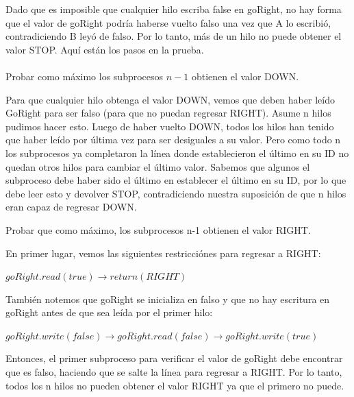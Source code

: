 \documentclass[12pt, letterpaper]{article}
\begin{document}
\begin{itemize}
Dado que es imposible que cualquier hilo escriba false en goRight, no hay forma que el valor de goRight podr\'ia haberse vuelto falso una vez que A lo escribi\'o, contradiciendo B ley\'o de falso.
Por lo tanto, m\'as de un hilo no puede obtener el valor STOP. Aqu\'i están los pasos en la prueba.
\\ \\
Probar como m\'aximo los subprocesos $n-1$ obtienen el valor DOWN.

Para que cualquier hilo obtenga el valor DOWN, vemos que deben haber leído
GoRight para ser falso (para que no puedan regresar RIGHT). Asume n hilos
pudimos hacer esto. Luego de haber vuelto DOWN, todos los hilos
han tenido que haber leído por última vez para ser desiguales a su valor. Pero como todo n
los subprocesos ya completaron la línea donde establecieron el último en su ID
no quedan otros hilos para cambiar el último valor. Sabemos que algunos
el subproceso debe haber sido el último en establecer el último en su ID, por lo que debe leer
esto y devolver STOP, contradiciendo nuestra suposición de que n hilos eran
capaz de regresar DOWN.



Probar que como máximo, los subprocesos n-1 obtienen el valor RIGHT.

En primer lugar, vemos las siguientes restricci\'ones para regresar a RIGHT:


\begin{center}
$goRight.read(true) \rightarrow return(RIGHT)$
\end{center}

También notemos que goRight se inicializa en falso y que no hay escritura en goRight antes de que sea le\'ida por el primer hilo:

\begin{center}
$goRight.write(f alse) \rightarrow goRight.read(f alse) \rightarrow goRight.write(true)$
\end{center}
Entonces, el primer subproceso para verificar el valor de goRight debe encontrar que es falso,
haciendo que se salte la l\'inea para regresar a RIGHT. Por lo tanto, todos los n hilos no pueden
obtener el valor RIGHT ya que el primero no puede.


\end{itemize}
\end{document}
